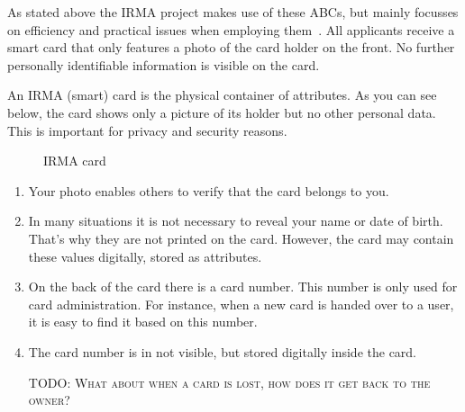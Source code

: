 As stated above the IRMA project makes use of these ABCs, but mainly focusses on efficiency and practical issues when employing them~\cite{abcofabc}. All applicants receive a smart card that only features a photo of the card holder on the front. No further personally identifiable information is visible on the card.

An IRMA (smart) card is the physical container of attributes. As you can see below, the card shows only a picture of its holder but no other personal data. This is important for privacy and security reasons.

\begin{figure}[!ht]
  \centering
  \caption{IRMA card}
  \label{fig:dummy}
\end{figure}

\begin{enumerate}
	\item Your photo enables others to verify that the card belongs to you.
  \item In many situations it is not necessary to reveal your name or date of birth. That’s why they are not printed on the card. However, the card may contain these values digitally, stored as attributes.
  \item On the back of the card there is a card number. This number is only used for card administration. For instance, when a new card is handed over to a user, it is easy to find it based on this number.
  \item The card number is in not visible, but stored digitally inside the card.
  
  \textsc{TODO: What about when a card is lost, how does it get back to the owner?}
\end{enumerate}

